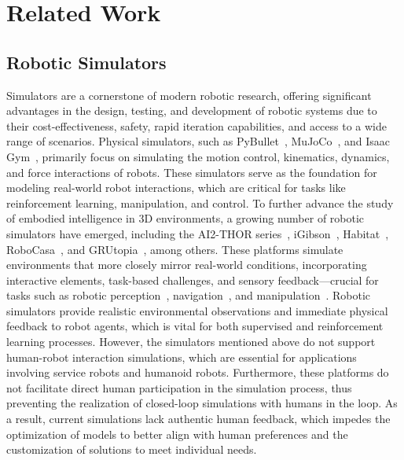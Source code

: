 \section{Related Work}
\label{sec:related}

\subsection{Robotic Simulators}
Simulators are a cornerstone of modern robotic research, offering significant advantages in the design, testing, and development of robotic systems due to their cost-effectiveness, safety, rapid iteration capabilities, and access to a wide range of scenarios. Physical simulators, such as PyBullet~\cite{coumans2021}, MuJoCo~\cite{todorov2012mujoco}, and Isaac Gym~\cite{makoviychuk2021isaac}, primarily focus on simulating the motion control, kinematics, dynamics, and force interactions of robots. These simulators serve as the foundation for modeling real-world robot interactions, which are critical for tasks like reinforcement learning, manipulation, and control.
To further advance the study of embodied intelligence in 3D environments, a growing number of robotic simulators have emerged, including the AI2-THOR series~\cite{kolve2017ai2, deitke2020robothor, ehsani2021manipulathor}, iGibson~\cite{shen2021igibson, li2021igibson, li2023behavior}, Habitat~\cite{savva2019habitat, szot2021habitat, puig2023habitat}, RoboCasa~\cite{nasiriany2024robocasa}, and GRUtopia~\cite{wang2024grutopia}, among others. These platforms simulate environments that more closely mirror real-world conditions, incorporating interactive elements, task-based challenges, and sensory feedback—crucial for tasks such as robotic perception~\cite{wang2024embodiedscan}, navigation~\cite{vuong2024habicrowd}, and manipulation~\cite{miller2004graspit}. Robotic simulators provide realistic environmental observations and immediate physical feedback to robot agents, which is vital for both supervised and reinforcement learning processes.
However, the simulators mentioned above do not support human-robot interaction simulations, which are essential for applications involving service robots and humanoid robots. Furthermore, these platforms do not facilitate direct human participation in the simulation process, thus preventing the realization of closed-loop simulations with humans in the loop. As a result, current simulations lack authentic human feedback, which impedes the optimization of models to better align with human preferences and the customization of solutions to meet individual needs.

